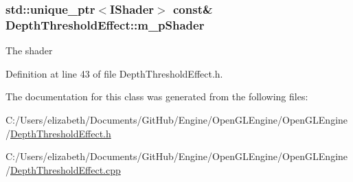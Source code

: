 \subsubsection[{\texorpdfstring{m\+\_\+p\+Shader}{m_pShader}}]{\setlength{\rightskip}{0pt plus 5cm}std\+::unique\+\_\+ptr$<${\bf I\+Shader}$>$ const\& Depth\+Threshold\+Effect\+::m\+\_\+p\+Shader\hspace{0.3cm}{\ttfamily [private]}}\hypertarget{class_depth_threshold_effect_a46e4bba75a147b68b493f4aef1981893}{}\label{class_depth_threshold_effect_a46e4bba75a147b68b493f4aef1981893}


The shader 



Definition at line 43 of file Depth\+Threshold\+Effect.\+h.



The documentation for this class was generated from the following files\+:\begin{DoxyCompactItemize}
\item 
C\+:/\+Users/elizabeth/\+Documents/\+Git\+Hub/\+Engine/\+Open\+G\+L\+Engine/\+Open\+G\+L\+Engine/\hyperlink{_depth_threshold_effect_8h}{Depth\+Threshold\+Effect.\+h}\item 
C\+:/\+Users/elizabeth/\+Documents/\+Git\+Hub/\+Engine/\+Open\+G\+L\+Engine/\+Open\+G\+L\+Engine/\hyperlink{_depth_threshold_effect_8cpp}{Depth\+Threshold\+Effect.\+cpp}\end{DoxyCompactItemize}
